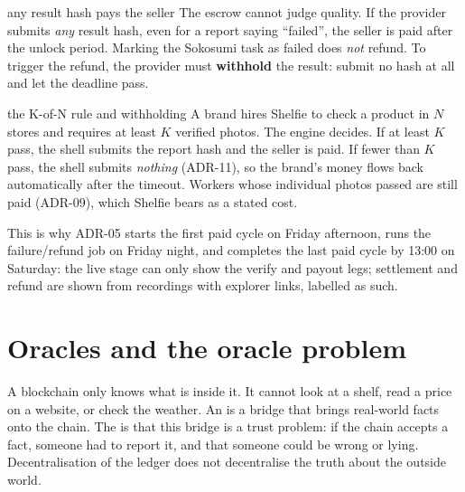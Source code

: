 \begin{warningbox}{any result hash pays the seller}
The escrow cannot judge quality. If the provider submits \emph{any} result hash, even for a report saying ``failed'', the seller is paid after the unlock period. Marking the Sokosumi task as failed does \emph{not} refund. To trigger the refund, the provider must \textbf{withhold} the result: submit no hash at all and let the deadline pass.
\end{warningbox}

\begin{shelfiebox}{the K-of-N rule and withholding}
A brand hires Shelfie to check a product in $N$ stores and requires at least $K$ verified photos. The engine decides. If at least $K$ pass, the shell submits the report hash and the seller is paid. If fewer than $K$ pass, the shell submits \emph{nothing} (ADR-11), so the brand's money flows back automatically after the timeout. Workers whose individual photos passed are still paid (ADR-09), which Shelfie bears as a stated cost.
\end{shelfiebox}

\begin{center}
\end{center}
This is why ADR-05 starts the first paid cycle on Friday afternoon, runs the failure/refund job on Friday night, and completes the last paid cycle by 13:00 on Saturday: the live stage can only show the verify and payout legs; settlement and refund are shown from recordings with explorer links, labelled as such.

\section{Oracles and the oracle problem}
A blockchain only knows what is inside it. It cannot look at a shelf, read a price on a website, or check the weather. An  is a bridge that brings real-world facts onto the chain. The  is that this bridge is a trust problem: if the chain accepts a fact, someone had to report it, and that someone could be wrong or lying. Decentralisation of the ledger does not decentralise the truth about the outside world.

